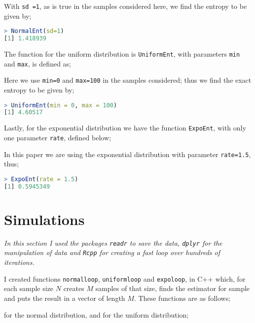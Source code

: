 \documentclass{report}
\begin{document}


With \texttt{sd =1}, as is true in the samples considered here, we find the entropy to be given by;

\begin{lstlisting}[language=R]
> NormalEnt(sd=1)
[1] 1.418939
\end{lstlisting}

The function for the uniform distribution is \texttt{UniformEnt}, with parameters \texttt{min} and \texttt{max}, is defined as;



Here we use \texttt{min=0} and \texttt{max=100} in the samples considered; thus we find the exact entropy to be given by;

\begin{lstlisting}[language=R]
> UniformEnt(min = 0, max = 100)
[1] 4.60517
\end{lstlisting}

Lastly, for the exponential distribution we have the function \texttt{ExpoEnt}, with only one parameter \texttt{rate}, defined below;



In this paper we are using the exponential distribution with parameter \texttt{rate=1.5}, thus;

\begin{lstlisting}[language=R]
> ExpoEnt(rate = 1.5)
[1] 0.5945349
\end{lstlisting}



\section{Simulations}

\textit{In this section I used the packages \texttt{readr} to save the data, \texttt{dplyr} for the manipulation of data and \texttt{Rcpp} for creating a fast loop over hundreds of iterations.} 

I created functions \texttt{normalloop}, \texttt{uniformloop} and \texttt{expoloop}, in C++ which, for each sample size $N$ creates $M$ samples of that size, finds the estimator for sample and puts the result in a vector of length $M$. These functions are as follows;



for the normal distribution, and for the uniform distribution;
\end{document}
